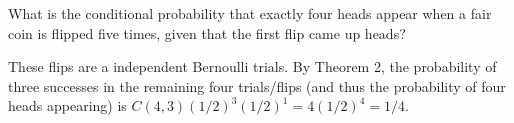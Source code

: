 \documentclass[../main.tex]{subfiles}
\begin{document}
What is the conditional probability that exactly four heads appear when a fair coin is flipped five times, given that the first flip came up heads?

\solution
These flips are a independent Bernoulli trials.
By Theorem 2, the probability of three successes in the remaining four trials/flips (and thus the probability of four heads appearing) is
\(
	C(4, 3)(1/2)^3(1/2)^1 = 4(1/2)^4 = 1/4.
\)
\end{document}
